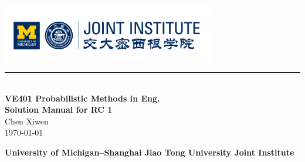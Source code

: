 \documentclass[12pt, a4paper]{article}
\newcommand{\HRule}{\rule{\linewidth}{0.5mm}}
\begin{document}
\renewcommand\arraystretch{1.5}
\setlength\parskip{.1\baselineskip}


\begin{titlepage}
  \begin{center}
  \includegraphics[width=0.7\textwidth]{./logo}\\
  \HRule\\[3cm]

  {\Huge\bfseries VE401 Probabilistic Methods in Eng.\\[0.5cm]Solution Manual for RC 1}\\[2cm]
  
  {\large Chen Xiwen}
  \\[1cm]
  {\large \today}
  \vfill

  \textbf{\small University of Michigan--Shanghai Jiao Tong University Joint Institute}
  \end{center}
\end{titlepage}


\newpage
\end{document}
